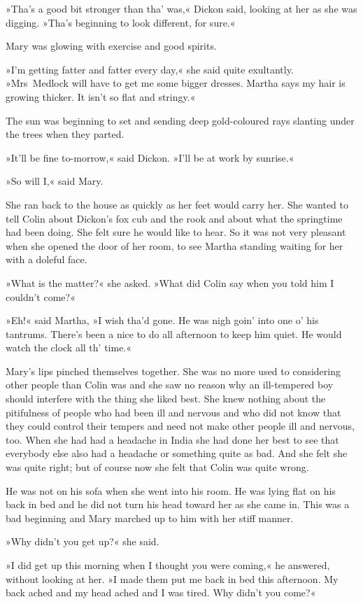 »Tha's a good bit stronger than tha' was,« Dickon said, looking at her as she was digging. »Tha's beginning to look different, for sure.«

Mary was glowing with exercise and good spirits.

»I'm getting fatter and fatter every day,« she said quite exultantly. »Mrs~Medlock will have to get me some bigger dresses. Martha says my hair is growing thicker. It isn't so flat and stringy.«

The sun was beginning to set and sending deep gold-coloured rays slanting under the trees when they parted.

»It'll be fine to-morrow,« said Dickon. »I'll be at work by sunrise.«

»So will I,« said Mary.

She ran back to the house as quickly as her feet would carry her. She wanted to tell Colin about Dickon's fox cub and the rook and about what the springtime had been doing. She felt sure he would like to hear. So it was not very pleasant when she opened the door of her room, to see Martha standing waiting for her with a doleful face.

»What is the matter?« she asked. »What did Colin say when you told him I couldn't come?«

»Eh!« said Martha, »I wish tha'd gone. He was nigh goin' into one o' his tantrums. There's been a nice to do all afternoon to keep him quiet. He would watch the clock all th' time.«

Mary's lips pinched themselves together. She was no more used to considering other people than Colin was and she saw no reason why an ill-tempered boy should interfere with the thing she liked best. She knew nothing about the pitifulness of people who had been ill and nervous and who did not know that they could control their tempers and need not make other people ill and nervous, too. When she had had a headache in India she had done her best to see that everybody else also had a headache or something quite as bad. And she felt she was quite right; but of course now she felt that Colin was quite wrong.

He was not on his sofa when she went into his room. He was lying flat on his back in bed and he did not turn his head toward her as she came in. This was a bad beginning and Mary marched up to him with her stiff manner.

»Why didn't you get up?« she said.

»I did get up this morning when I thought you were coming,« he answered, without looking at her. »I made them put me back in bed this afternoon. My back ached and my head ached and I was tired. Why didn't you come?«

